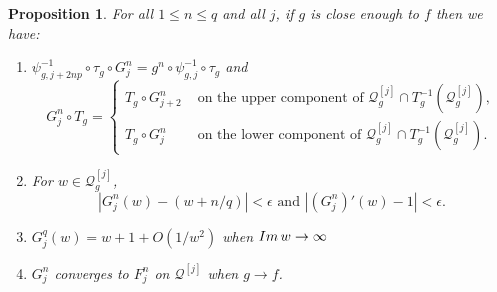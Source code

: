 \documentclass[12pt,letterpaper]{amsart}
\numberwithin{equation}{section}
\newtheorem{prop}[equation]{Proposition}
\theoremstyle{remark}
\theoremstyle{definition}
\newcommand{\QQ}{\mathcal Q}
\begin{document}
	
	\begin{prop}\label{prop:lifted perturbed}
		For all $1\leq n \leq q$ and all $j$,  if $g$ is close enough to $f$ then we have:
		\begin{enumerate}
			\item $\psi_{g,j+2np}^{-1}\circ \tau_g\circ {G}^n_j =g^n\circ \psi_{g,j}^{-1}\circ \tau_g$ and $$G_j^n\circ T_g = \begin{cases}
				 T_g\circ G^{n}_{j+2} &\text{ on the upper component of }\QQ_g^{[j]}\cap T_g^{-1}(\QQ_g^{[j]}),\\
				 T_g\circ G^{n}_{j} &\text{ on the lower component of }\QQ_g^{[j]}\cap T_g^{-1}(\QQ_g^{[j]}).
			\end{cases}$$
			\item For $w\in \QQ_g^{[j]}$, 
			$$|{G}^n_j(w) - (w+n/q)|< \epsilon \text{ and }|( {G}_j^n)'(w) -1|< \epsilon.$$
			\item ${G}^q_j(w) = w+1+O(1/w^2)$ when $\emph{Im}\,w\to \infty$
			\item ${G}_j^n$ converges to ${F}^n_j$ on $\QQ^{[j]}$ when $g\to f$.
		\end{enumerate}
	\end{prop}
	
	
	
	
	
\end{document}
